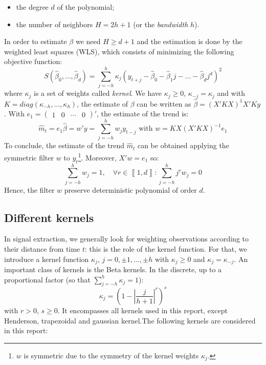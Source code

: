 \documentclass[
  12pt,
  ,
  a4paper]{article}
\newcommand\1{\mathds{1}}
\begin{document}
\begin{itemize}
\item
  the degree \(d\) of the polynomial;
\item
  the number of neighbors \(H=2h+1\) (or the \emph{bandwidth} \(h\)).
\end{itemize}

In order to estimate \(\beta\) we need \(H\geq d+1\) and the estimation is done by the weighted least squares (WLS), which consists of minimizing the following objective function:
\[
S(\hat{\beta}_{0},\dots,\hat{\beta}_{d})=\sum_{j=-h}^{h}\kappa_{j}(y_{t+j}-\hat{\beta}_{0}-\hat{\beta}_{1}j-\dots-\hat{\beta}_{d}j^{d})^{2}
\]
where \(\kappa_j\) is a set of weights called \emph{kernel}. We have \(\kappa_j\geq 0\), \(\kappa_{-j}=\kappa_j\) and with \(K=diag(\kappa_{-h},\dots,\kappa_{h})\), the estimate of \(\beta\) can be written as \(\hat{\beta}=(X'KX)^{1}X'Ky\).
With \(e_{1}=\begin{pmatrix}1&0&\cdots&0\end{pmatrix}'\), the estimate of the trend is:
\[
\hat{m}_{t}=e_{1}\hat{\beta}=w'y=\sum_{j=-h}^{h}w_{j}y_{t-j}\text{ with }w=KX(X'KX)^{-1}e_{1}
\]
To conclude, the estimate of the trend \(\hat{m}_{t}\) can be obtained applying the symmetric filter \(w\) to \(y_t\)\footnote{\(w\) is symmetric due to the symmetry of the kernel weights \(\kappa_j\).}.
Moreover, \(X'w=e_{1}\) so:
\[
\sum_{j=-h}^{h}w_{j}=1,\quad\forall r\in\left\llbracket 1,d\right\rrbracket :\sum_{j=-h}^{h}j^{r}w_{j}=0
\]
Hence, the filter \(w\) preserve deterministic polynomial of order \(d\).

\hypertarget{sec:kernels}{%
\subsection{Different kernels}\label{sec:kernels}}

In signal extraction, we generally look for weighting observations according to their distance from time \(t\): this is the role of the kernel function.
For that, we introduce a kernel function \(\kappa_j\), \(j=0,\pm1,\dots,\pm h\) with \(\kappa_j \geq0\) and \(\kappa_j=\kappa_{-j}\).
An important class of kernels is the Beta kernels. In the discrete, up to a proportional factor (so that \(\sum_{j=-h}^h\kappa_j=1\)):
\[
\kappa_j = \left(
  1-
  \left\lvert
  \frac j {h+1}
  \right\lvert^r
\right)^s
\]
with \(r>0\), \(s\geq 0\).
It encompasses all kernels used in this report, except Henderson, trapezoidal and gaussian kernel.The following kernels are considered in this report:
\end{document}
